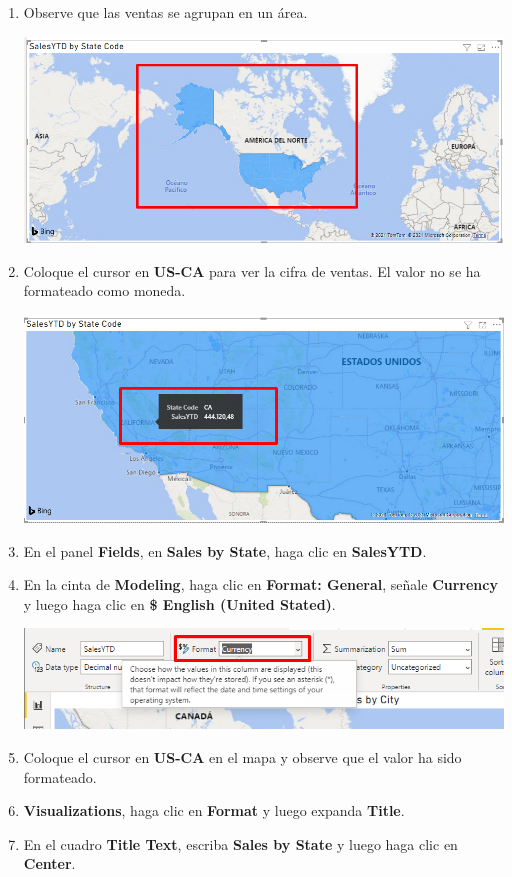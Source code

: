 \documentclass[12pt,letterpaper]{article}
\newcommand\tab[1][1cm]{\hspace*{#1}}
\begin{document}
\begin{enumerate}[\tab 1.]
\begin{center}
        \end{center}
        \item Observe que las ventas se agrupan en un área.
        \begin{center}
            \includegraphics[width=13cm]{./img/img129.png}
        \end{center}
        \item Coloque el cursor en \textbf{US-CA} para ver la cifra de ventas. El valor no se ha formateado como moneda.
        \begin{center}
            \includegraphics[width=13cm]{./img/img130.png}
        \end{center}
        \item En el panel \textbf{Fields}, en \textbf{Sales by State}, haga clic en \textbf{SalesYTD}.
        \item En la cinta de \textbf{Modeling}, haga clic en \textbf{Format: General}, señale \textbf{Currency} y luego haga clic en \textbf{\$ English (United Stated)}.
        \begin{center}
            \includegraphics[width=13cm]{./img/img132.png}
        \end{center}
        \item Coloque el cursor en \textbf{US-CA} en el mapa y observe que el valor ha sido formateado.
        \item \textbf{Visualizations}, haga clic en \textbf{Format} y luego expanda \textbf{Title}.
        \item En el cuadro \textbf{Title Text}, escriba \textbf{Sales by State} y luego haga clic en \textbf{Center}.
    \end{enumerate}
    
\end{document}

